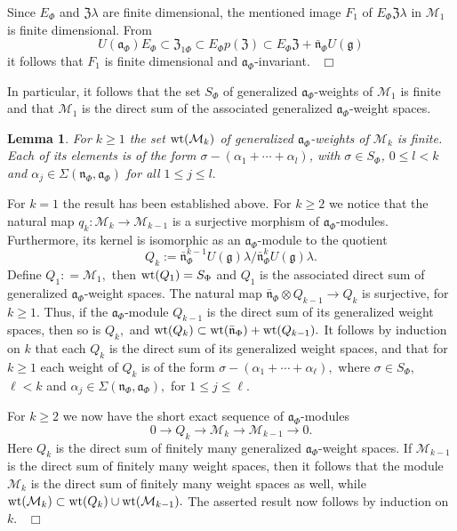 \documentclass[12pt,a4paper]{article}
\newtheorem{Lemma}[Thm]{Lemma}
\newenvironment{lemma}[0]{\begin{Lemma}\noindent}%
{\end{Lemma}}
\def\proof{\par\noindent{\it Proof.}{\ }{\ }}
\def\qed{~\hfill\hbox{$\Box$}\medbreak}
\def\ga{\alpha}
\def\gl{\lambda}
\def\gs{\sigma}
\def\gS{\Sigma}
\def\got#1{\mathfrak #1}
\def\fa{{\got a}}
\def\fg{{\got g}}
\def\fn{{\got n}}
\def\to{\rightarrow}
\def\cM{{\mathcal M}}
\numberwithin{Thm}{section}
\numberwithin{equation}{section}
\def\bfn{\bar\fn}
\def\fZ{{\mathfrak Z}}
\numberwithin{equation}{section}
\def\fZ{{\mathfrak Z}}
\def\bfn{{\bar \fn}}
\def\wt{{\rm wt}}
\begin{document}
\proof
Since $E_\Phi$ and $\fZ \gl$ are finite dimensional, the mentioned image
$F_1$ of $E_\Phi \fZ \gl$ in $\cM_1$ is finite dimensional. From 
$$ 
U(\fa_\Phi)E_\Phi  \subset \fZ_{1\Phi } \subset  E_\Phi p(\fZ)  \subset E_\Phi \fZ + \bar \fn_\Phi U(\fg)
$$%
it follows that  $F_1$ is finite dimensional and $\fa_\Phi$-invariant. 
\qed

In particular, it follows that the set $S_\Phi$ of generalized $\fa_\Phi$-weights
of $\cM_1$ is finite and that $\cM_1$ is the direct sum of the associated
generalized $\fa_\Phi$-weight spaces.



\begin{lemma}
For $k\geq 1$ the set $\wt(\cM_k)$ of generalized $\fa_\Phi$-weights of 
$\cM_k$ is finite. Each of its elements is of the form  
$\gs - (\ga_1 + \cdots + \ga_l)$, with $\gs \in S_\Phi$, $0 \leq l < k$ 
and $\ga_j \in \gS(\fn_\Phi, \fa_\Phi)$ for all $1 \leq j \leq l.$ 
\end{lemma}

\proof 
For $k=1$ the result has been established above. For  $k\geq 2$ we notice
that the natural map $q_k: \cM_{k} \to \cM_{k-1}$ is a surjective morphism of 
$\fa_\Phi$-modules. Furthermore, its kernel is isomorphic as an $\fa_\Phi$-module 
to the quotient
$$ 
Q_k := \bfn^{k-1}_\Phi U(\fg) \gl / \bfn_\Phi^{k}U(\fg) \gl. 
$$%
Define $Q_1: =  \cM_1,$ then $\wt(Q_1) = S_\Phi$ and $Q_1$ is the associated
direct sum of generalized $\fa_\Phi$-weight spaces. 
The natural map $\bar\fn_\Phi \otimes Q_{k-1} \to Q_k$ is surjective, for $k \geq 1.$ 
Thus, if the $\fa_\Phi$-module $Q_{k-1}$ is the direct sum of its generalized weight spaces, then so is $Q_k,$ and $\wt(Q_k) \subset \wt(\bfn_\Phi) + \wt(Q_{k-1}).$ 
It follows by induction on $k$ that each $Q_k$ is the direct sum of its
generalized weight spaces, and that for $k \geq 1$ each weight of $Q_k$ is 
of the form $\gs - (\ga_1+  \cdots + \ga_\ell),$ where $\gs \in S_\Phi,$ $\ell < k$ and $\ga_j \in \gS(\fn_\Phi, \fa_\Phi),$ for $1 \leq j \leq \ell.$ 

For $k \geq 2$ we now have the short exact sequence of $\fa_\Phi$-modules
$$ 
0 \to Q_k \to \cM_k \to \cM_{k-1} \to 0.
$$%
Here $Q_k$ is the direct sum of finitely many generalized $\fa_\Phi$-weight spaces. 
If $\cM_{k-1}$ is the direct sum of finitely many weight spaces, then it follows
that the module $\cM_k$ is the direct sum of finitely many weight spaces as well,
while $\wt(\cM_k) \subset \wt (Q_k ) \cup \wt(\cM_{k-1}).$ The asserted result
now follows by induction on $k.$ 
\qed
\end{document}
